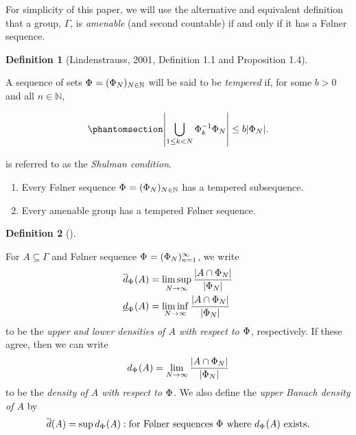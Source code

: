 \documentclass[
  british,
]{article}
\providecommand{\tightlist}{%
  \setlength{\itemsep}{0pt}\setlength{\parskip}{0pt}}
\theoremstyle{definition}
\newtheorem{definition}{Definition}[section]
\theoremstyle{plain}
\theoremstyle{plain}
\theoremstyle{plain}
\theoremstyle{remark}
\newcommand{\AmenableGroup}{{\Gamma}}
\newcommand{\CountingMeasure}[1]{{\left|#1\right|}}
\newcommand{\Folner}[1][\vphantom{}]{{\Phi}_{#1}}
\newcommand{\Group}{{\Gamma}}
\newcommand{\UpperBanachDensity}[1]{\overline{d}({#1})}
\newcommand{\Density}[2][\Folner]{d_{{#1}}({#2})}
\newcommand{\LowerDensity}[2][\Folner]{\underline{d}_{{#1}}({#2})}
\newcommand{\UpperDensity}[2][\Folner]{\overline{d}_{{#1}}({#2})}
\begin{document}
For simplicity of this paper, we will use the alternative and equivalent
definition that a group, \(\AmenableGroup\), is \emph{amenable} (and
second countable) if and only if it has a Følner sequence.

\begin{definition}[{Lindenstrauss, 2001, Definition 1.1 and Proposition
1.4}]\protect\hypertarget{def-TemperedSequenceDef}{}\label{def-TemperedSequenceDef}

A sequence of sets \(\Folner=(\Folner[N])_{N\in\mathbb{N}}\) will be
said to be \emph{tempered} if, for some \(b>0\) and all
\(n\in\mathbb{N}\),

\begin{equation}\protect\phantomsection\label{eq-ShulmanCondition}{
\CountingMeasure{\bigcup_{1\leq k<N}\Folner[k]^{-1}\Folner[N]}\leq b\CountingMeasure{\Folner[N]}.
}\end{equation}

is referred to as the \emph{Shulman condition}.

\begin{enumerate}
\def\labelenumi{\arabic{enumi}.}
\tightlist
\item
  Every Følner sequence \(\Folner=(\Folner[N])_{N\in\mathbb{N}}\) has a
  tempered subsequence.
\item
  Every amenable group has a tempered Følner sequence.
\end{enumerate}

\end{definition}

\begin{definition}[]\protect\hypertarget{def-DensityDef}{}\label{def-DensityDef}

For \(A\subseteq\Group\) and Følner sequence
\(\Folner=(\Folner[N])_{n=1}^\infty\), we write
\begin{align*}     \UpperDensity{A}&=\limsup_{N\rightarrow\infty}\frac{\CountingMeasure{A\cap\Folner[N]}}{\CountingMeasure{\Folner[N]}}     \\\LowerDensity{A}&=\liminf_{N\rightarrow\infty}\frac{\CountingMeasure{A\cap\Folner[N]}}{\CountingMeasure{\Folner[N]}} \end{align*}
to be the \emph{upper and lower densities of \(A\) with respect to
\(\Folner\)}, respectively. If these agree, then we can write \[
\Density{A}=\lim_{N\rightarrow\infty}\frac{\CountingMeasure{A\cap\Folner[N]}}{\CountingMeasure{\Folner[N]}}
\] to be the \emph{density of \(A\) with respect to \(\Folner\)}. We
also define the \emph{upper Banach density of \(A\)} by \[
\UpperBanachDensity{A}=\sup{d_{\Folner}(A):\text{for Følner sequences }\Folner\text{ where }d_{\Folner}(A)\text{ exists}}.
\]

\end{definition}
\end{document}
